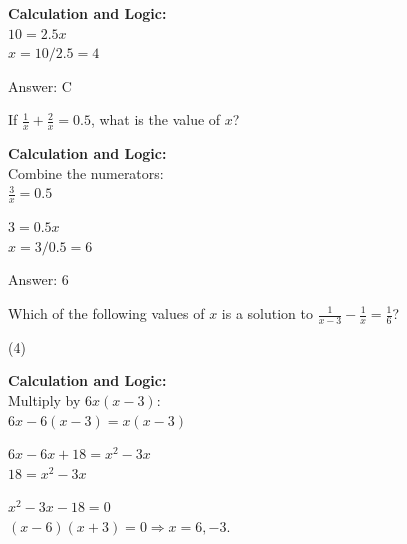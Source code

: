 \documentclass[11pt,paper=a4,answers]{exam}
\begin{document}
\begin{questions}
\begin{solution}
\textbf{Calculation and Logic:} \\
$10 = 2.5x$ \\
$x = 10 / 2.5 = 4$

\vspace{30pt}

Answer: \colorbox{yellow!100}{C}
\end{solution}

\vspace{40pt}

\question
If $\frac{1}{x} + \frac{2}{x} = 0.5$, what is the value of $x$?

\begin{solution}
\textbf{Calculation and Logic:} \\
Combine the numerators: \\
$\frac{3}{x} = 0.5$

\vspace{15pt}

$3 = 0.5x$ \\
$x = 3 / 0.5 = 6$

\vspace{30pt}

Answer: \colorbox{yellow!100}{6}
\end{solution}

\vspace{40pt}

\question
Which of the following values of $x$ is a solution to $\frac{1}{x-3} - \frac{1}{x} = \frac{1}{6}$?
\begin{tasks}(4)
\end{tasks}

\begin{solution}
\textbf{Calculation and Logic:} \\
Multiply by $6x(x-3)$: \\
$6x - 6(x-3) = x(x-3)$

\vspace{15pt}

$6x - 6x + 18 = x^2 - 3x$ \\
$18 = x^2 - 3x$

\vspace{15pt}

$x^2 - 3x - 18 = 0$ \\
$(x-6)(x+3) = 0 \Rightarrow x = 6, -3$.


\end{solution}
\end{questions}
\end{document}
